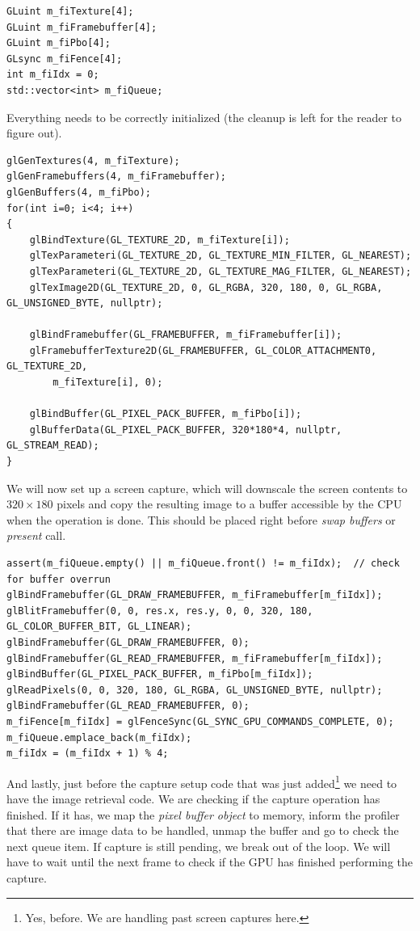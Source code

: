 \documentclass[hidelinks,titlepage,a4paper,twoside]{article}
\begin{document}
\begin{lstlisting}
GLuint m_fiTexture[4];
GLuint m_fiFramebuffer[4];
GLuint m_fiPbo[4];
GLsync m_fiFence[4];
int m_fiIdx = 0;
std::vector<int> m_fiQueue;
\end{lstlisting}

Everything needs to be correctly initialized (the cleanup is left for the reader to figure out).

\begin{lstlisting}
glGenTextures(4, m_fiTexture);
glGenFramebuffers(4, m_fiFramebuffer);
glGenBuffers(4, m_fiPbo);
for(int i=0; i<4; i++)
{
    glBindTexture(GL_TEXTURE_2D, m_fiTexture[i]);
    glTexParameteri(GL_TEXTURE_2D, GL_TEXTURE_MIN_FILTER, GL_NEAREST);
    glTexParameteri(GL_TEXTURE_2D, GL_TEXTURE_MAG_FILTER, GL_NEAREST);
    glTexImage2D(GL_TEXTURE_2D, 0, GL_RGBA, 320, 180, 0, GL_RGBA, GL_UNSIGNED_BYTE, nullptr);

    glBindFramebuffer(GL_FRAMEBUFFER, m_fiFramebuffer[i]);
    glFramebufferTexture2D(GL_FRAMEBUFFER, GL_COLOR_ATTACHMENT0, GL_TEXTURE_2D,
		m_fiTexture[i], 0);

    glBindBuffer(GL_PIXEL_PACK_BUFFER, m_fiPbo[i]);
    glBufferData(GL_PIXEL_PACK_BUFFER, 320*180*4, nullptr, GL_STREAM_READ);
}
\end{lstlisting}

We will now set up a screen capture, which will downscale the screen contents to $320\times180$ pixels and copy the resulting image to a buffer accessible by the CPU when the operation is done. This should be placed right before \emph{swap buffers} or \emph{present} call.

\begin{lstlisting}
assert(m_fiQueue.empty() || m_fiQueue.front() != m_fiIdx);	// check for buffer overrun
glBindFramebuffer(GL_DRAW_FRAMEBUFFER, m_fiFramebuffer[m_fiIdx]);
glBlitFramebuffer(0, 0, res.x, res.y, 0, 0, 320, 180, GL_COLOR_BUFFER_BIT, GL_LINEAR);
glBindFramebuffer(GL_DRAW_FRAMEBUFFER, 0);
glBindFramebuffer(GL_READ_FRAMEBUFFER, m_fiFramebuffer[m_fiIdx]);
glBindBuffer(GL_PIXEL_PACK_BUFFER, m_fiPbo[m_fiIdx]);
glReadPixels(0, 0, 320, 180, GL_RGBA, GL_UNSIGNED_BYTE, nullptr);
glBindFramebuffer(GL_READ_FRAMEBUFFER, 0);
m_fiFence[m_fiIdx] = glFenceSync(GL_SYNC_GPU_COMMANDS_COMPLETE, 0);
m_fiQueue.emplace_back(m_fiIdx);
m_fiIdx = (m_fiIdx + 1) % 4;
\end{lstlisting}

And lastly, just before the capture setup code that was just added\footnote{Yes, before. We are handling past screen captures here.} we need to have the image retrieval code. We are checking if the capture operation has finished. If it has, we map the \emph{pixel buffer object} to memory, inform the profiler that there are image data to be handled, unmap the buffer and go to check the next queue item. If capture is still pending, we break out of the loop. We will have to wait until the next frame to check if the GPU has finished performing the capture.
\end{document}
